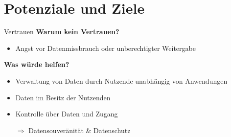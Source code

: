 
\section{Potenziale und Ziele}

\begin{frame}{Vertrauen}
    \textbf{Warum kein Vertrauen?}
    \begin{itemize}
        \item Angst vor Datenmissbrauch oder unberechtigter Weitergabe~\cite{mollerIndustrialDataEcosystems2024}
    \end{itemize}

    \pause
    \textbf{Was würde helfen?}
    \begin{itemize}
        \item Verwaltung von Daten durch Nutzende unabhängig von Anwendungen
        \item Daten im Besitz der Nutzenden
        \item Kontrolle über Daten und Zugang

        \pause
        \item[$\Rightarrow$] Datensouveränität \& Datenschutz
    \end{itemize}
\end{frame}

